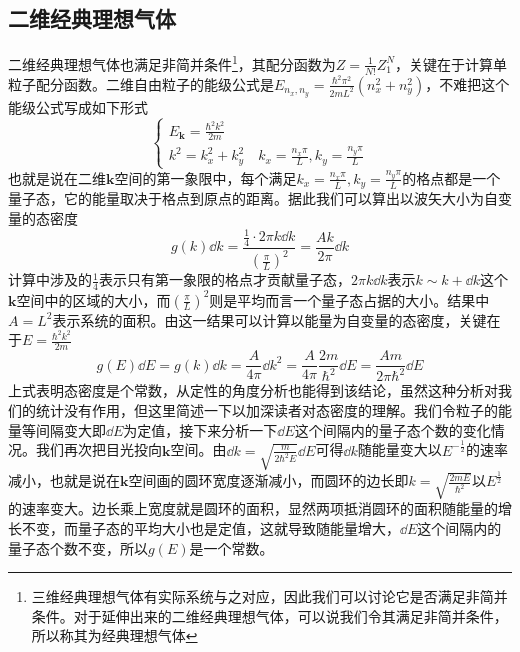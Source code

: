 \documentclass[../../main.tex]{subfiles}
\begin{document}
\subsection{二维经典理想气体}
二维经典理想气体也满足非简并条件\footnote{三维经典理想气体有实际系统与之对应，因此我们可以讨论它是否满足非简并条件。对于延伸出来的二维经典理想气体，可以说我们令其满足非简并条件，所以称其为经典理想气体}，其配分函数为\(Z=\frac{1}{N!}Z_1^N\)，关键在于计算单粒子配分函数。二维自由粒子的能级公式是\(E_{n_x,n_y}=\frac{\hbar^2\pi^2}{2mL^2}(n_x^2+n_y^2)\)，不难把这个能级公式写成如下形式
\begin{equation}
    \begin{cases}
        \displaystyle E_{\bm{k}}=\frac{\hbar^2k^2}{2m} \\
        \displaystyle k^2=k_x^2+k_y^2 \quad k_x=\frac{n_x\pi}{L},k_y=\frac{n_y\pi}{L}
    \end{cases}
\end{equation}
也就是说在二维\(\bm{k}\)空间的第一象限中，每个满足\(k_x=\frac{n_x\pi}{L},k_y=\frac{n_y\pi}{L}\)的格点都是一个量子态，它的能量取决于格点到原点的距离。据此我们可以算出以波矢大小为自变量的态密度
\begin{equation}
    g(k)\dd k=\frac{\frac{1}{4}\cdot2\pi k\dd k}{\left(\frac{\pi}{L}\right)^2}=\frac{Ak}{2\pi}\dd k
\end{equation}
计算中涉及的\(\frac{1}{4}\)表示只有第一象限的格点才贡献量子态，\(2\pi k\dd k\)表示\(k\sim k+\dd k\)这个\(\bm{k}\)空间中的区域的大小，而\(\left(\frac{\pi}{L}\right)^2\)则是平均而言一个量子态占据的大小。结果中\(A=L^2\)表示系统的面积。由这一结果可以计算以能量为自变量的态密度，关键在于\(E=\frac{\hbar^2k^2}{2m}\)
\begin{equation}
    g(E)\dd E=g(k)\dd k=\frac{A}{4\pi}\dd k^2=\frac{A}{4\pi}\frac{2m}{\hbar^2}\dd E=\frac{Am}{2\pi\hbar^2}\dd E
\end{equation}
上式表明态密度是个常数，从定性的角度分析也能得到该结论，虽然这种分析对我们的统计没有作用，但这里简述一下以加深读者对态密度的理解。我们令粒子的能量等间隔变大即\(\dd E\)为定值，接下来分析一下\(\dd E\)这个间隔内的量子态个数的变化情况。我们再次把目光投向\(\bm{k}\)空间。由\(\dd k=\sqrt{\frac{m}{2\hbar^2E}}\dd E\)可得\(\dd k\)随能量变大以\(E^{-\frac{1}{2}}\)的速率减小，也就是说在\(\bm{k}\)空间画的圆环宽度逐渐减小，而圆环的边长即\(k=\sqrt{\frac{2mE}{\hbar^2}}\)以\(E^{\frac{1}{2}}\)的速率变大。边长乘上宽度就是圆环的面积，显然两项抵消圆环的面积随能量的增长不变，而量子态的平均大小也是定值，这就导致随能量增大，\(\dd E\)这个间隔内的量子态个数不变，所以\(g(E)\)是一个常数。
\end{document}
